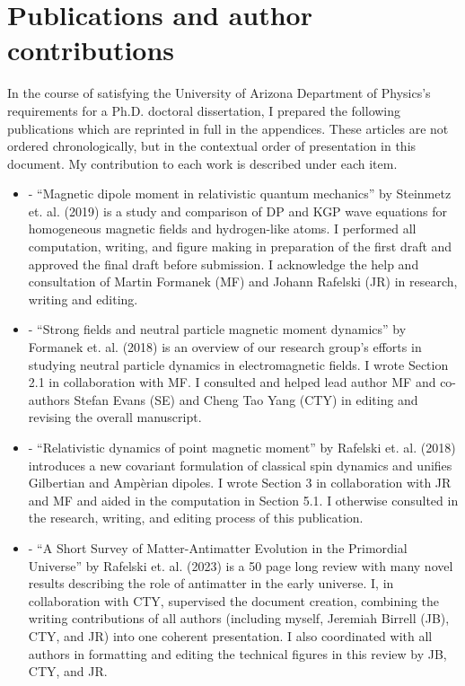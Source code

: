 \chapter*{Publications and author contributions}
\label{sec:pubs}
In the course of satisfying the University of Arizona Department of Physics's requirements for a Ph.D. doctoral dissertation, I prepared the following publications which are reprinted in full in the appendices. These articles are not ordered chronologically, but in the contextual order of presentation in this document. My contribution to each work is described under each item.
\begin{itemize}
    \item {} - ``Magnetic dipole moment in relativistic quantum mechanics'' by Steinmetz et. al. (2019) is a study and comparison of DP and KGP wave equations for homogeneous magnetic fields and hydrogen-like atoms. I performed all computation, writing, and figure making in preparation of the first draft and approved the final draft before submission. I acknowledge the help and consultation of Martin Formanek (MF) and Johann Rafelski (JR) in research, writing and editing.
    \item {} - ``Strong fields and neutral particle magnetic moment dynamics'' by Formanek et. al. (2018) is an overview of our research group's efforts in studying neutral particle dynamics in electromagnetic fields. I wrote Section 2.1 in collaboration with MF. I consulted and helped lead author MF and co-authors Stefan Evans (SE) and Cheng Tao Yang (CTY) in editing and revising the overall manuscript.
    \item {} - ``Relativistic dynamics of point magnetic moment'' by Rafelski et. al. (2018) introduces a new covariant formulation of classical spin dynamics and unifies Gilbertian and Amp{\`e}rian dipoles. I wrote Section 3 in collaboration with JR and MF and aided in the computation in Section 5.1. I otherwise consulted in the research, writing, and editing process of this publication. 
    \item {} - ``A Short Survey of Matter-Antimatter Evolution in the Primordial Universe'' by Rafelski et. al. (2023) is a 50 page long review with many novel results describing the role of antimatter in the early universe. I, in collaboration with CTY,  supervised the document creation, combining the writing contributions of all authors (including myself, Jeremiah Birrell (JB), CTY, and JR) into one coherent presentation. I also coordinated with all authors in formatting and editing the technical figures in this review by JB, CTY, and JR.

\end{itemize}
